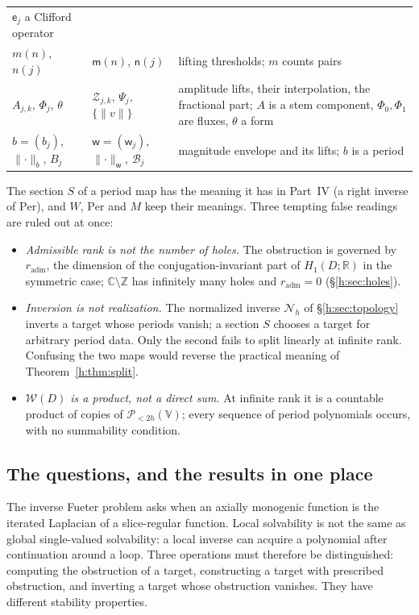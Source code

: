 \documentclass[11pt,a4paper]{article}
\numberwithin{equation}{section}
\theoremstyle{definition}
\theoremstyle{remark}
\theoremstyle{plain}
\newcommand{\RR}{\mathbb R}
\newcommand{\CC}{\mathbb C}
\newcommand{\ZZ}{\mathbb Z}
\newcommand{\thet}{\theta}
\newcommand{\Per}{\mathrm{Per}}
\newcommand{\norm}[1]{\lVert #1\rVert}
\newcommand{\VV}{\mathbb V}                       %
\newcommand{\PolH}{\mathscr P_{<2h}(\VV)}
\begin{document}
{\begin{longtable}{@{}p{}p{}p{}@{}}
 $\mathsf e_j$ a Clifford operator\\
$m(n)$, $n(j)$ & $\mathsf m(n)$, $\mathsf n(j)$ & lifting thresholds; $m$
 counts pairs\\
$A_{j,k}$, $\Phi_j$, $\theta$ & $\mathcal Z_{j,k}$, $\Psi_j$,
 $\{\norm v\}$ & amplitude lifts, their interpolation, the fractional part;
 $A$ is a stem component, $\Phi_0,\Phi_1$ are fluxes, $\thet$ a form\\
$b=(b_j)$, $\norm\cdot_b$, $B_j$ & $\mathsf w=(\mathsf w_j)$,
 $\norm\cdot_{\mathsf w}$, $\mathcal B_j$ & magnitude envelope and its lifts;
 $b$ is a period\\
\bottomrule
\end{longtable}}

The section $S$ of a period map has the meaning it has in Part~IV (a right
inverse of $\Per$), and $W$, $\Per$ and $M$ keep their meanings. Three tempting
false readings are ruled out at once:
\begin{itemize}
\item \emph{Admissible rank is not the number of holes.} The obstruction is
governed by $r_{\mathrm{adm}}$, the dimension of the conjugation-invariant part
of $H_1(D;\RR)$ in the symmetric case; $\CC\setminus\ZZ$ has infinitely many
holes and $r_{\mathrm{adm}}=0$ (\S\ref{h:sec:holes}).
\item \emph{Inversion is not realization.} The normalized inverse
$\mathcal N_h$ of \S\ref{h:sec:topology} inverts a target whose periods vanish;
a section $S$ chooses a target for arbitrary period data. Only the second
fails to split linearly at infinite rank. Confusing the two maps would reverse
the practical meaning of Theorem~\ref{h:thm:split}.
\item \emph{$\mathscr W(D)$ is a product, not a direct sum.} At infinite rank
it is a countable product of copies of $\PolH$; every sequence of period
polynomials occurs, with no summability condition.
\end{itemize}

\subsection{The questions, and the results in one place}
\label{h:sec:intro}

The inverse Fueter problem asks when an axially monogenic function is the
iterated Laplacian of a slice-regular function. Local solvability is not the
same as global single-valued solvability: a local inverse can acquire a
polynomial after continuation around a loop. Three operations must therefore
be distinguished: computing the obstruction of a target, constructing a
target with prescribed obstruction, and inverting a target whose obstruction
vanishes. They have different stability properties.
\end{document}
